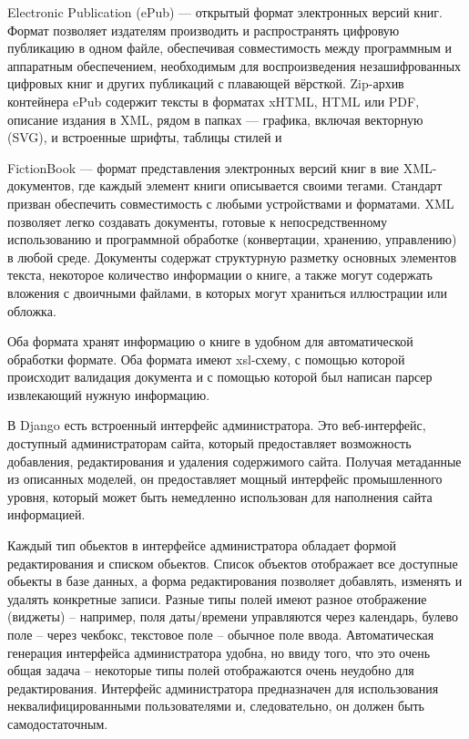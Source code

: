 \documentclass[a4paper]{report}
\begin{document}
Electronic Publication (ePub) — открытый формат электронных версий книг. Формат позволяет издателям производить и распространять цифровую публикацию в одном файле, обеспечивая совместимость между программным и аппаратным обеспечением, необходимым для воспроизведения незашифрованных цифровых книг и других публикаций с плавающей вёрсткой.
Zip-архив контейнера ePub содержит тексты в форматах xHTML, HTML или PDF, описание издания в XML, рядом в папках — графика, включая векторную (SVG), и встроенные шрифты, таблицы стилей и \td 

FictionBook — формат представления электронных версий книг в вие XML-документов, где каждый элемент книги описывается своими тегами. Стандарт призван обеспечить совместимость с любыми устройствами и форматами. XML позволяет легко создавать документы, готовые к непосредственному использованию и программной обработке (конвертации, хранению, управлению) в любой среде. Документы содержат структурную разметку основных элементов текста, некоторое количество информации о книге, а также могут содержать вложения с двоичными файлами, в которых могут храниться иллюстрации или обложка.

Оба формата хранят информацию о книге в удобном для автоматической обработки формате. Оба формата имеют xsl-схему, с помощью которой происходит валидация документа и с помощью которой был написан парсер извлекающий нужную информацию.


В Django есть встроенный интерфейс администратора. Это веб-интерфейс, доступный администраторам сайта, который предоставляет возможность добавления, редактирования и удаления содержимого сайта. Получая метаданные из описанных моделей, он предоставляет мощный интерфейс промышленного уровня, который может быть немедленно использован для наполнения сайта информацией.

Каждый тип обьектов в интерфейсе администратора обладает формой редактирования и списком обьектов. Список объектов отображает все доступные обьекты в базе данных, а форма редактирования позволяет добавлять, изменять и удалять конкретные записи. 
Разные типы полей имеют разное отображение (виджеты) -- например, поля даты/времени управляются через календарь, булево поле -- через чекбокс, текстовое поле -- обычное поле ввода. 
Автоматическая генерация интерфейса администратора удобна, но ввиду того, что это очень общая задача -- некоторые типы полей отображаются очень неудобно для редактирования. Интерфейс администратора предназначен для использования неквалифицированными пользователями и, следовательно, он должен быть самодостаточным.
\end{document}

